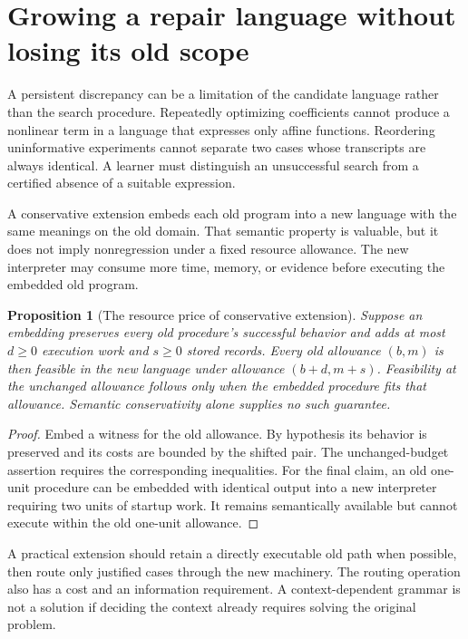 \documentclass[11pt,letterpaper]{article}
\theoremstyle{plain}
\newtheorem{proposition}[theorem]{Proposition}
\theoremstyle{definition}
\begin{document}
\section{Growing a repair language without losing its old scope}\label{sec:grammar}
A persistent discrepancy can be a limitation of the candidate language rather than the search procedure. Repeatedly optimizing coefficients cannot produce a nonlinear term in a language that expresses only affine functions. Reordering uninformative experiments cannot separate two cases whose transcripts are always identical. A learner must distinguish an unsuccessful search from a certified absence of a suitable expression.

A conservative extension embeds each old program into a new language with the same meanings on the old domain. That semantic property is valuable, but it does not imply nonregression under a fixed resource allowance. The new interpreter may consume more time, memory, or evidence before executing the embedded old program.

\begin{proposition}[The resource price of conservative extension]\label{prop:extension}
Suppose an embedding preserves every old procedure's successful behavior and adds at most $d\geq0$ execution work and $s\geq0$ stored records. Every old allowance $(b,m)$ is then feasible in the new language under allowance $(b+d,m+s)$. Feasibility at the unchanged allowance follows only when the embedded procedure fits that allowance. Semantic conservativity alone supplies no such guarantee.
\end{proposition}
\begin{proof}
Embed a witness for the old allowance. By hypothesis its behavior is preserved and its costs are bounded by the shifted pair. The unchanged-budget assertion requires the corresponding inequalities. For the final claim, an old one-unit procedure can be embedded with identical output into a new interpreter requiring two units of startup work. It remains semantically available but cannot execute within the old one-unit allowance.
\end{proof}

A practical extension should retain a directly executable old path when possible, then route only justified cases through the new machinery. The routing operation also has a cost and an information requirement. A context-dependent grammar is not a solution if deciding the context already requires solving the original problem.
\end{document}
